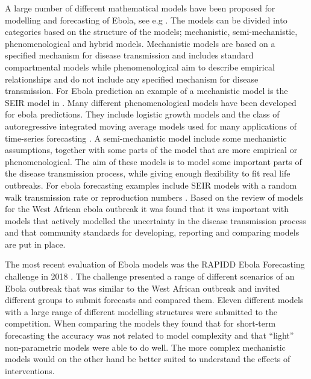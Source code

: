 \documentclass[12pt]{article}
\begin{document}
A large number of different mathematical models have been proposed for modelling and forecasting of Ebola, see e.g \cite{chretienMathematicalModelingWest,viboudRAPIDDEbolaForecasting2018}. The models can be divided into categories based on the structure of the models; mechanistic, semi-mechanistic, phenomenological and hybrid models. Mechanistic models are based on a specified mechanism for disease transmission and includes standard compartmental models while phenomenological aim to describe empirical relationships and do not include any specified mechanism for disease transmission. For Ebola prediction an example of a mechanistic model is the SEIR model in \cite{gaffeyApplicationCDCEbolaResponse2018}. Many different phenomenological models have been developed for ebola predictions. They include logistic growth models \cite{pellUsingPhenomenologicalModels2018} and the class of autoregressive integrated moving average models used for many applications of time-series forecasting \cite{mForecastingTrendCases2017}. A semi-mechanistic model include some mechanistic assumptions, together with some parts of the model that are more empirical or phenomenological. The aim of these models is to model some important parts of the disease transmission process, while giving enough flexibility to fit real life outbreaks. For ebola forecasting examples include SEIR models with a random walk transmission rate or reproduction numbers  \cite{asherForecastingEbolaRegression2018,funkAssessingPerformanceRealtime2019}. Based on the review of models for the West African ebola outbreak it was found that it was important with models that actively modelled the uncertainty in the disease transmission process \cite{chretienMathematicalModelingWest, kingAvoidableErrorsModelling2015} and that community standards for developing, reporting and comparing models are put in place. 

The most recent evaluation of Ebola models was the RAPIDD Ebola Forecasting challenge in 2018 \cite{viboudRAPIDDEbolaForecasting2018}. The challenge presented a range of different scenarios of an Ebola outbreak that was similar to the West African outbreak and invited different groups to submit forecasts and compared them. Eleven different models with a large range of different modelling structures were submitted to the competition. When comparing the models they found that for short-term forecasting the accuracy was not related to model complexity and that ``light'' non-parametric models were able to do well. The more complex mechanistic models would on the other hand be better suited to understand the effects of interventions. 
\end{document}
